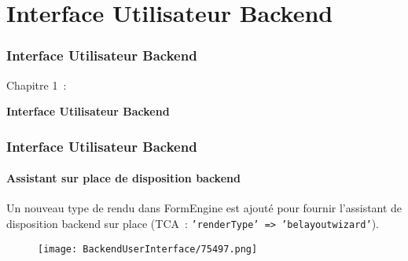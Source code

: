 %

\section{Interface Utilisateur Backend}
\begin{frame}[fragile]
	\frametitle{Interface Utilisateur Backend}

	\begin{center}\huge{Chapitre 1~:}\end{center}
	\begin{center}\huge{\color{typo3darkgrey}\textbf{Interface Utilisateur Backend}}\end{center}

\end{frame}

\begin{frame}[fragile]
	\frametitle{Interface Utilisateur Backend}
	\framesubtitle{Assistant sur place de disposition backend}

	Un nouveau type de rendu dans FormEngine est ajouté pour fournir l'assistant
	de disposition backend sur place (TCA~: \texttt{'renderType' => 'belayoutwizard'}).

	\begin{figure}
		\texttt{[image: BackendUserInterface/75497.png]}
	\end{figure}

\end{frame}


